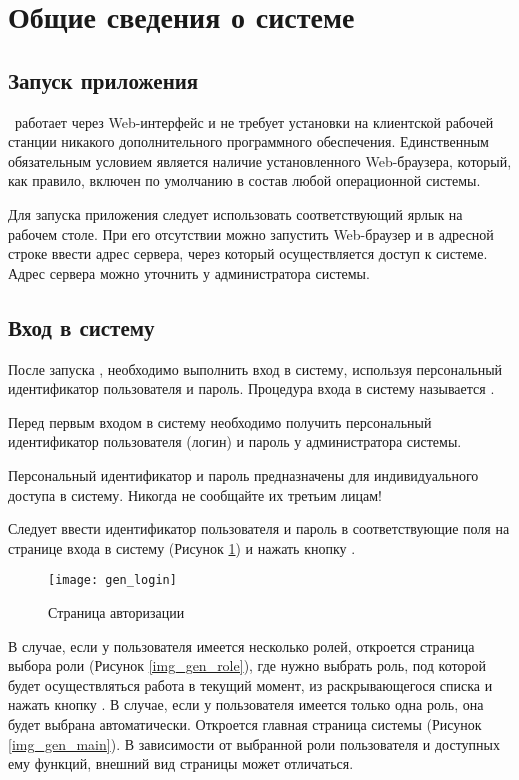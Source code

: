 \newpage
\section{Общие сведения о системе}
\subsection{Запуск приложения}

\tmis~работает через Web-интерфейс и не требует установки на клиентской рабочей станции никакого дополнительного программного обеспечения. Единственным обязательным условием является наличие установленного Web-браузера, который, как правило, включен по умолчанию в состав любой операционной системы.

Для запуска приложения следует использовать соответствующий ярлык на рабочем столе. При его отсутствии можно запустить Web-браузер и в адресной строке ввести адрес сервера, через который осуществляется доступ к системе. Адрес сервера можно уточнить у администратора системы. 

\subsection{Вход в систему}

После запуска \tmisr , необходимо выполнить вход в систему, используя персональный идентификатор пользователя и пароль. Процедура входа в систему называется . \label{auth}

Перед первым входом в систему необходимо получить персональный идентификатор пользователя (логин) и пароль у администратора системы.

\begin{vnim}
 Персональный идентификатор и пароль предназначены для индивидуального доступа в систему. Никогда не сообщайте их третьим лицам!
\end{vnim}
 
Следует ввести идентификатор пользователя и пароль в соответствующие поля на странице входа в систему (Рисунок \ref{img_gen_login}) и нажать кнопку . 

\begin{figure}[!ht]\centering
 \texttt{[image: gen\_login]}
 \caption{Страница авторизации}
 \label{img_gen_login}
\end{figure} 

В случае, если у пользователя имеется несколько ролей, откроется страница выбора роли (Рисунок \ref{img_gen_role}), где  нужно выбрать роль, под которой будет осуществляться работа в текущий момент, из раскрывающегося списка  и нажать кнопку . В случае, если у пользователя имеется только одна роль, она будет выбрана автоматически. Откроется главная страница системы (Рисунок \ref{img_gen_main}). В зависимости от выбранной роли пользователя и доступных ему функций, внешний вид страницы может отличаться.  

